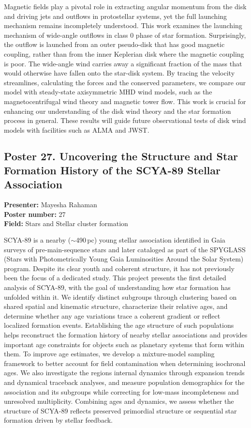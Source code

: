 Magnetic fields play a pivotal role in extracting angular momentum from the disk and driving jets and outflows in protostellar systems, yet the full launching mechanism remains incompletely understood. This work examines the launching mechanism of wide-angle outflows in class 0 phase of star formation. Surprisingly, the outflow is launched from an outer pseudo-disk that has good magnetic coupling, rather than from the inner Keplerian disk where the magnetic coupling is poor. The wide-angle wind carries away a significant fraction of the mass that would otherwise have fallen onto the star-disk system. By tracing the velocity streamlines, calculating the forces and the conserved parameters, we compare our model with steady-state axisymmetric MHD wind models, such as the magnetocentrifugal wind theory and magnetic tower flow. This work is crucial for enhancing our understanding of the disk wind theory and the star formation process in general. These results will guide future observational tests of disk wind models with facilities such as ALMA and JWST.

\hypertarget{poster-abstract-talk-153}{}\label{poster-abstract-page-talk-153}
\subsection*{Poster 27. Uncovering the Structure and Star Formation History of the SCYA-89 Stellar Association}
\textbf{Presenter:} Mayesha Rahaman\\
\textbf{Poster number:} 27\\
\textbf{Field:} Stars and Stellar cluster formation

SCYA-89 is a nearby ($\sim$490\,pc) young stellar association identified in Gaia surveys of pre-main-sequence stars and later cataloged as part of the SPYGLASS (Stars with Photometrically Young Gaia Luminosities Around the Solar System) program. Despite its clear youth and coherent structure, it has not previously been the focus of a dedicated study. This project presents the first detailed analysis of SCYA-89, with the goal of understanding how star formation has unfolded within it. We identify distinct subgroups through clustering based on shared spatial and kinematic structure, characterize their relative ages, and determine whether any age variations trace a coherent gradient or reflect localized formation events. Establishing the age structure of such populations helps reconstruct the formation history of nearby stellar associations and provides important age constraints for objects such as planetary systems that form within them. To improve age estimates, we develop a mixture-model sampling framework to better account for field contamination when determining isochronal ages. We also investigate the regions internal dynamics through expansion trends and dynamical traceback analyses, and measure population demographics for the association and its subgroups while correcting for low-mass incompleteness and unresolved multiplicity. Combining ages and dynamics, we assess whether the structure of SCYA-89 reflects preserved primordial structure or sequential star formation driven by stellar feedback.


